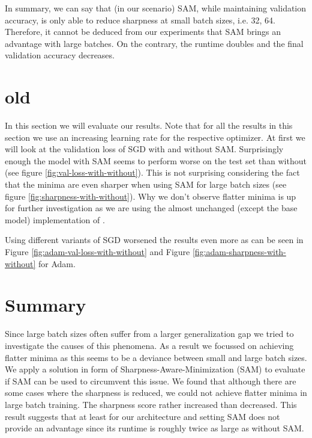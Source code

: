\documentclass[10pt,conference,compsocconf]{IEEEtran}
\begin{document}
In summary, we can say that (in our scenario) SAM, while maintaining validation accuracy, is only able to reduce sharpness at small batch sizes, i.e. {32, 64}. Therefore, it cannot be deduced from our experiments that SAM brings an advantage with large batches. On the contrary, the runtime doubles and the final validation accuracy decreases.

\section{old}
In this section we will evaluate our results. Note that for all the results in this section we use an increasing learning rate for the respective optimizer. At first we will look at the validation loss of SGD with and without SAM. Surprisingly enough the model with SAM seems to perform worse on the test set than without (see figure \ref{fig:val-loss-with-without}). This is not surprising considering the fact that the minima are even sharper when using SAM for large batch sizes (see figure \ref{fig:sharpness-with-without}). Why we don't observe flatter minima is up for further investigation as we are using the almost unchanged (except the base model) implementation of \cite{paulSharpnessAwareMinimizationTensorFlow2022}.


Using different variants of SGD worsened the results even more as can be seen in Figure \ref{fig:adam-val-loss-with-without} and Figure \ref{fig:adam-sharpness-with-without} for Adam.



\section{Summary}

Since large batch sizes often suffer from a larger generalization gap we tried to investigate the causes of this phenomena. As a result we focussed on achieving flatter minima as this seems to be a deviance between small and large batch sizes. We apply a solution in form of Sharpness-Aware-Minimization (SAM) to evaluate if SAM can be used to circumvent this issue. We found that although there are some cases where the sharpness is reduced, we could not achieve flatter minima in large batch training. The sharpness score rather increased than decreased. This result suggests that at least for our architecture and setting SAM does not provide an advantage since its runtime is roughly twice as large as without SAM.
\end{document}
